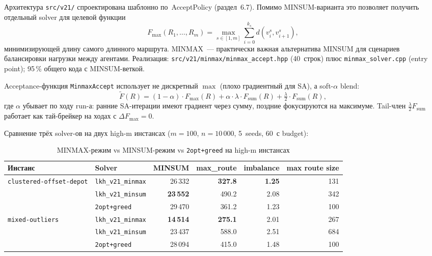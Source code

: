 \documentclass[14pt,a4paper]{extarticle}
\begin{document}
Архитектура \texttt{src/v21/} спроектирована шаблонно по~AcceptPolicy (раздел~6.7). Помимо MINSUM-варианта это позволяет получить отдельный solver для целевой функции
\[
F_{\max}(R_1, \ldots, R_m) = \max_{s \in [1,m]} \sum_{i=0}^{k_s} d(v^s_i, v^s_{i+1}),
\]
минимизирующей длину самого длинного маршрута. MINMAX~--- практически важная альтернатива MINSUM для сценариев балансировки нагрузки между агентами. Реализация: \texttt{src/v21/minmax/minmax\_accept.hpp} (40~строк) плюс \texttt{minmax\_solver.cpp} (entry point); 95\,\% общего кода с MINSUM-веткой.

Acceptance-функция \texttt{MinmaxAccept} использует не дискретный $\max$ (плохо градиентный для SA), а soft-$\alpha$ blend:
\[
\widetilde{F}(R) = (1 - \alpha) \cdot F_{\max}(R) + \alpha \cdot \lambda \cdot F_{\mathrm{sum}}(R) + \tfrac{\lambda}{2} \cdot F_{\mathrm{sum}}(R),
\]
где $\alpha$ убывает по ходу run-а: ранние SA-итерации имеют градиент через сумму, поздние фокусируются на максимуме. Tail-член $\tfrac{\lambda}{2} F_{\mathrm{sum}}$ работает как тай-брейкер на ходах с $\Delta F_{\max} = 0$.

Сравнение трёх solver-ов на двух high-m инстансах ($m=100$, $n=10\,000$, 5~seeds, 60~с budget):

\begin{table}[H]
\centering
\caption{MINMAX-режим vs MINSUM-режим vs \texttt{2opt+greed} на high-m инстансах}
\small
\begin{tabular}{llrrrr}
\toprule
Инстанс & Solver & MINSUM & max\_route & imbalance & max route size\\
\midrule
\multirow{3}{*}{\texttt{clustered-offset-depot}}
  & \texttt{lkh\_v21\_minmax} & 26\,332 & \textbf{327.8} & \textbf{1.25} & 131\\
  & \texttt{lkh\_v21\_minsum} & \textbf{23\,552} & 490.2 & 2.08 & 342\\
  & \texttt{2opt+greed}      & 29\,470 & 361.2 & 1.23 & 100\\
\midrule
\multirow{3}{*}{\texttt{mixed-outliers}}
  & \texttt{lkh\_v21\_minmax} & \textbf{14\,514} & \textbf{275.1} & 2.01 & 267\\
  & \texttt{lkh\_v21\_minsum} & 23\,437 & 588.0 & 2.51 & 684\\
  & \texttt{2opt+greed}      & 28\,094 & 415.0 & 1.48 & 100\\
\bottomrule
\end{tabular}
\normalsize
\end{table}
\end{document}
